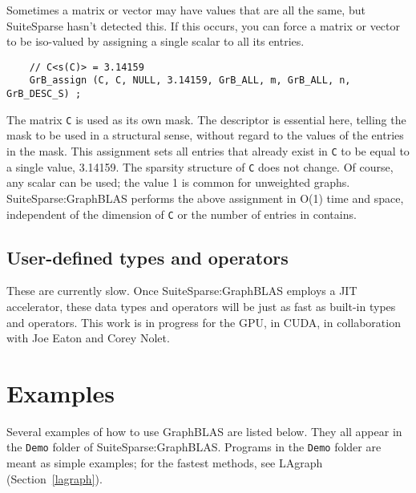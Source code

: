 \documentclass[12pt]{article}
\begin{document}
{Sometimes a matrix or vector may have values that are all the same, but
SuiteSparse hasn't detected this.  If this occurs, you can force a matrix
or vector to be iso-valued by assigning a single scalar to all its entries.

    {\scriptsize
    \begin{verbatim}
    // C<s(C)> = 3.14159
    GrB_assign (C, C, NULL, 3.14159, GrB_ALL, m, GrB_ALL, n, GrB_DESC_S) ; \end{verbatim}}

The matrix \verb'C' is used as its own mask.  The descriptor is essential here,
telling the mask to be used in a structural sense, without regard to the values
of the entries in the mask.  This assignment sets all entries that already
exist in \verb'C' to be equal to a single value, 3.14159. The sparsity
structure of \verb'C' does not change.  Of course, any scalar can be used; the
value 1 is common for unweighted graphs.  SuiteSparse:GraphBLAS performs the
above assignment in O(1) time and space, independent of the dimension of
\verb'C' or the number of entries in contains.

\subsection{User-defined types and operators}

These are currently slow.  Once SuiteSparse:GraphBLAS employs a JIT
accelerator, these data types and operators will be just as fast as built-in
types and operators.  This work is in progress for the GPU, in CUDA, in
collaboration with Joe Eaton and Corey Nolet.

\newpage
\section{Examples} %
\label{examples}

Several examples of how to use GraphBLAS are listed below.  They all
appear in the \verb'Demo' folder of SuiteSparse:GraphBLAS.  Programs in
the \verb'Demo' folder are meant as simple examples; for the fastest methods,
see LAgraph (Section~\ref{lagraph}).

}
\end{document}
